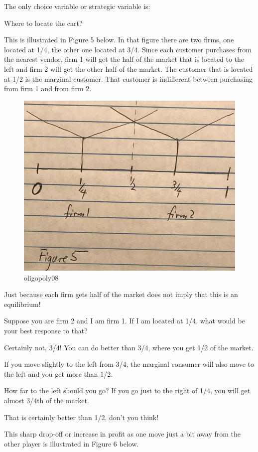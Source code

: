 \documentclass[
]{book}
\begin{document}
The only choice variable or strategic variable is:

Where to locate the cart?

This is illustrated in Figure 5 below. In that figure there are two firms, one located at 1/4, the other one located at 3/4. Since each customer purchases from the nearest vendor, firm 1 will get the half of the market that is located to the left and firm 2 will get the other half of the market. The customer that is located at 1/2 is the marginal customer. That customer is indifferent between purchasing from firm 1 and from firm 2.

\begin{figure}

{\centering \includegraphics[width=0.5\linewidth]{img/oligopoly/fig8} 

}

\caption{oligopoly08}\label{fig:oligopoly08}
\end{figure}

Just because each firm gets half of the market does not imply that this is an equilibrium!

Suppose you are firm 2 and I am firm 1. If I am located at 1/4, what would be your best response to that?

Certainly not, 3/4! You can do better than 3/4, where you get 1/2 of the market.

If you move slightly to the left from 3/4, the marginal consumer will also move to the left and you get more than 1/2.

How far to the left should you go? If you go just to the right of 1/4, you will get almost 3/4th of the market.

That is certainly better than 1/2, don't you think!

This sharp drop-off or increase in profit as one move just a bit away from the other player is illustrated in Figure 6 below.
\end{document}
